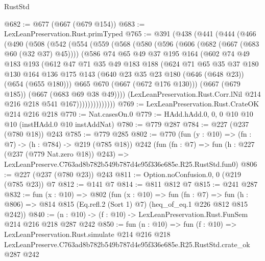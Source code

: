 \begin{lexlean}{RustStd}
\begin{coremodule}
@682 := @677 (@667 (@679 @154))
@683 := LexLeanPreservation.Rust.primTyped
@765 := @391
    (@438
      (@441
        (@444
          (@466
            (@490
              (@508
                (@542
                  (@554
                    (@559
                      (@568
                        (@580
                          (@596
                            (@606 (@682 (@667 (@683 @60 (@32 @37) @45))))
                            (@586
                              @74
                              @65
                              @49
                              @37
                              @195
                              @164
                              (@602
                                @74
                                @49
                                @183
                                @193
                                (@612
                                  @47
                                  @71
                                  @35
                                  @49
                                  @183
                                  @188
                                  (@624
                                    @71
                                    @65
                                    @35
                                    @37
                                    @180
                                    @130
                                    @164
                                    @136
                                    @175
                                    @143
                                    (@640 @23 @35 @23 @180 (@646 (@648 @23)) (@654 (@655 @180)))
                                    @665
                                    @670
                                    (@667 (@672 @176 @130)))
                                  (@667 (@679 @185))
                                  (@667 (@683 @69 @38 @49))))
                              (LexLeanPreservation.Rust.Corr.lNil
                                @214
                                @216
                                @218
                                @541
                                @167))))))))))))))
@769 := LexLeanPreservation.Rust.CrateOK @214 @216 @218
@770 := Nat.casesOn.{0}
@779 := HAdd.hAdd.{0, 0, 0} @10 @10 @10 (instHAdd.{0} @10 instAddNat)
@780 := @779 @287
@784 := @227 (@237 (@780 @18)) @243
@785 := @779 @285
@802 := @770
    (fun (y : @10) => (fn : @7) -> (h : @784) -> @219 (@785 @18))
    @242
    (fun (fn : @7) =>
    fun (h : @227 (@237 (@779 Nat.zero @18)) @243) =>
    LexLeanPreserve.C763ad8b782b549b787d4e95f336e685e.R25.RustStd.fun0)
@806 := @227 (@237 (@780 @23)) @243
@811 := Option.noConfusion.{0, 0} (@219 (@785 @23)) @7
@812 := @141 @7
@814 := @811 @812 @7
@815 := @241 @287
@832 := fun (x : @10) =>
  @802
    (fun (x : @10) =>
    fun (fn : @7) =>
    fun (h : @806) => @814 @815 (Eq.refl.{2} (Sort 1) @7) (heq_of_eq.{1} @226 @812 @815 @242))
@840 := (n : @10) -> (f : @10) -> LexLeanPreservation.Rust.FunSem @214 @216 @218 @287 @242
@850 := fun (n : @10) =>
  fun (f : @10) =>
  LexLeanPreservation.Rust.simulate
    @214
    @216
    @218
    LexLeanPreserve.C763ad8b782b549b787d4e95f336e685e.R25.RustStd.crate_ok
    @287
    @242
\end{coremodule}
\end{lexlean}
